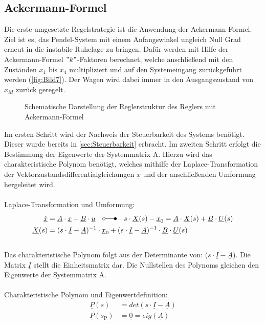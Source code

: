 \documentclass[
	pagesize,
	fontsize=12pt,
	paper=a4,
	oneside,
   reqno
]{scrartcl}
\begin{document}
\subsection{Ackermann-Formel} \label{sec:Ackermann-Formel}
Die erste umgesetzte Regelstrategie ist die Anwendung der Ackermann-Formel. Ziel ist es, das Pendel-System mit einem Anfangswinkel ungleich Null Grad erneut in die instabile Ruhelage zu bringen. Dafür werden mit Hilfe der Ackermann-Formel $"k"$-Faktoren berechnet, welche anschließend mit den Zuständen $x_{\mathrm{1}}$ bis $x_{\mathrm{4}}$ multipliziert und auf den Systemeingang zurückgeführt werden (\autoref{fig:Bild7}). Der Wagen wird dabei immer in den Ausgangszustand von $x_M$ zurück geregelt.
\begin{figure}[H]
    \centering
    \caption[Reglerstruktur Ackermann]{Schematische Darstellung der Reglerstruktur des Reglers mit Ackermann-Formel}
    \label{fig:Bild7}
\end{figure}
Im ersten Schritt wird der Nachweis der Steuerbarkeit des Systems benötigt. Dieser wurde bereits in \autoref{sec:Steuerbarkeit} erbracht.
Im zweiten Schritt erfolgt die Bestimmung der Eigenwerte der Systemmatrix A. Hierzu wird das charakteristische Polynom benötigt, welches mithilfe der Laplace-Transformation der Vektorzustandsdifferentialgleichungen $\underline{\dot{x}}$ und der anschließenden Umformung hergeleitet wird.\\\\
Laplace-Transformation und Umformung:
\begin{align*}
    \underline{\dot{x}} &= \underline{A}\cdot\underline{x}+\underline{B}\cdot\underline{u}\quad\laplace \quad s\cdot \underline{X}(s)-\underline{x}_{\mathrm{0}}=\underline{A}\cdot \underline{X}(s)+\underline{B}\cdot \underline{U}(s) \\
    \underline{X}(s) &= (s\cdot \underline{I} - \underline{A})^{-1}\cdot\underline{x}_{\mathrm{0}}+(s\cdot \underline{I} - \underline{A})^{-1}\cdot\underline{B}\cdot\underline{U}(s)
\end{align*}\\
Das charakteristische Polynom folgt aus der Determinante von: ($s\cdot\underline{I}-\underline{A}$). Die Matrix $\underline{I}$ stellt die Einheitsmatrix dar. Die Nullstellen des Polynoms gleichen den Eigenwerte der Systemmatrix A.\\\\
Charakteristische Polynom und Eigenwertdefinition:
\begin{align*}
    \underline{P}(s) &= det(s\cdot\underline{I}-\underline{A}) \\
    \underline{P}(s_{\mathrm{P}}) &= \underline{0} = eig(\underline{A})
\end{align*}
\end{document}
